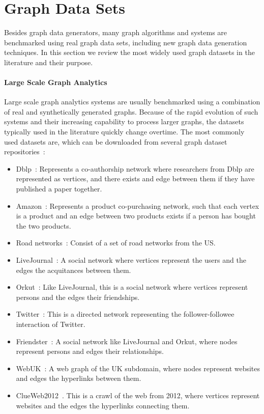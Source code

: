 \section{Graph Data Sets}

Besides graph data generators, many graph algorithms and systems are benchmarked
using real graph data sets, including new graph data generation techniques. In
this section we review the most widely used graph datasets in the literature and
their purpose.


\paragraph{Large Scale Graph Analytics}

Large scale graph analytics systems are usually benchmarked using a combination of
real and synthetically generated graphs. Because of the rapid evolution of such
systems and their increasing capability to process larger graphs, the datasets
typically used  in the literature quickly change overtime. The most commonly
used datasets are, which can be downloaded from several graph dataset
repositories~\cite{snapnets,lawalgo}: 
\begin{itemize}
  \item Dblp~\cite{yang2015defining}: Represents a co-authorship network where
    researchers from Dblp are represented as vertices, and there exists and edge
    between them if they have published a paper together. 
  \item Amazon~\cite{yang2015defining}: Represents a product co-purchasing
    network, such that each vertex is a product and an edge between two products
    exists if a person has bought the two products. 
  \item Road networks~\cite{leskovec2009community}: Consist of a set of road
    networks from the US.  
  \item LiveJournal~\cite{yang2015defining}: A social network where vertices
    represent the users and the edges the acquitances between them.
  \item Orkut~\cite{yang2015defining}: Like LiveJournal, this is a social network
    where vertices represent persons and the edges their friendships.
  \item Twitter~\cite{kwak2010twitter}: This is a directed network representing
    the follower-followee interaction of Twitter.
  \item Friendster~\cite{yang2015defining}: A social network like LiveJournal and
    Orkut, where nodes represent persons and edges their relationships.
  \item WebUK~\cite{delis}: A web graph of the UK subdomain, where nodes represent
    websites and edges the hyperlinks between them.
  \item ClueWeb2012~\cite{clueweb}. This is a crawl of the web from 2012, where
    vertices represent websites and the edges the hyperlinks connecting them.
\end{itemize}


